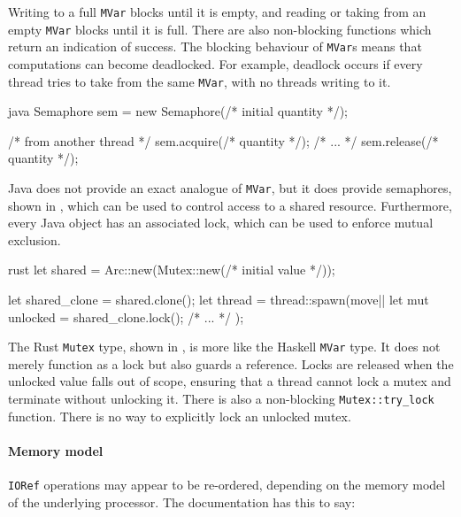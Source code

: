 Writing to a full \verb|MVar| blocks until it is empty, and reading or
taking from an empty \verb|MVar| blocks until it is full.  There are
also non-blocking functions which return an indication of success.
The blocking behaviour of \verb|MVar|s means that computations can
become deadlocked.  For example, deadlock occurs if every thread tries
to take from the same \verb|MVar|, with no threads writing to it.

\begin{listing}
\centering
\begin{cminted}{java}
Semaphore sem = new Semaphore(/* initial quantity */);

/* from another thread */
sem.acquire(/* quantity */);
/* ... */
sem.release(/* quantity */);
\end{cminted}
\caption{Mutual exclusion in Java.}\label{lst:mute_java}
\end{listing}

Java does not provide an exact analogue of \verb|MVar|, but it does
provide semaphores\cite{ewd123}, shown in , which
can be used to control access to a shared resource.  Furthermore,
every Java object has an associated lock, which can be used to enforce
mutual exclusion.

\begin{listing}
\centering
\begin{cminted}{rust}
let shared = Arc::new(Mutex::new(/* initial value */));

let shared_clone = shared.clone();
let thread = thread::spawn(move|| {
    let mut unlocked = shared_clone.lock();
    /* ... */
});
\end{cminted}
\caption{Mutual exclusion in Rust.}\label{lst:mute_rust}
\end{listing}

The Rust \verb|Mutex| type, shown in , is more
like the Haskell \verb|MVar| type.  It does not merely function as a
lock but also guards a reference.  Locks are released when the
unlocked value falls out of scope, ensuring that a thread cannot lock
a mutex and terminate without unlocking it.  There is also a
non-blocking \verb|Mutex::try_lock| function.  There is no way to
explicitly lock an unlocked mutex.

\paragraph{Memory model}
\verb|IORef| operations may appear to be re-ordered, depending on the
memory model of the underlying processor.  The documentation has this
to say:

